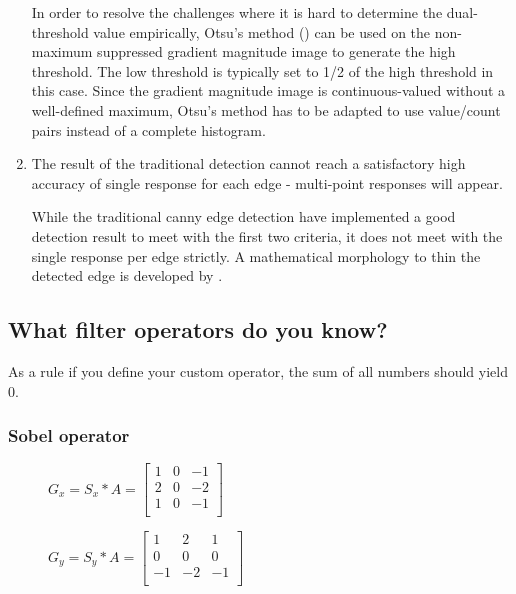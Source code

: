 \begin{enumerate}
    In order to resolve the challenges where it is hard to determine the dual-threshold value empirically, Otsu's method (\cite{otsu79}) can be used on the non-maximum suppressed gradient magnitude image to generate the high threshold. The low threshold is typically set to 1/2 of the high threshold in this case. Since the gradient magnitude image is continuous-valued without a well-defined maximum, Otsu's method has to be adapted to use value/count pairs instead of a complete histogram.

    \item The result of the traditional detection cannot reach a satisfactory high accuracy of single response for each edge - multi-point responses will appear.

    While the traditional canny edge detection have implemented a good detection result to meet with the first two criteria, it does not meet with the single response per edge strictly. A mathematical morphology to thin the detected edge is developed by \cite{mallat92}.
\end{enumerate}




\subsection{What filter operators do you know?}
As a rule if you define your custom operator, the sum of all numbers should yield 0.
\subsubsection{Sobel operator}

\begin{figure}[!htb]
    \centering
    \begin{minipage}{.5\textwidth}
        \centering
        $G_{x} = S_{x} * A =
        \left[ \begin{array}{rrr}
        1 & 0 & -1 \\
        2 & 0 & -2 \\
        1 & 0 & -1 \\
        \end{array}\right] $
    \end{minipage}%
    \begin{minipage}{.5\textwidth}
        \centering
        $G_{y} = S_{y} * A =
        \left[ \begin{array}{rrr}
        1 & 2 & 1 \\
        0 & 0 & 0 \\
        -1 & -2 & -1 \\
        \end{array}\right] $
    \end{minipage}
\end{figure}


